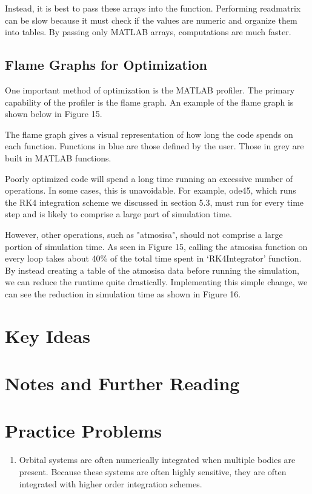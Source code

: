 \documentclass[12pt]{report}
\begin{document}
Instead, it is best to pass these arrays into the function. Performing readmatrix can be slow because it must check if the values are numeric and organize them into tables. By passing only MATLAB arrays, computations are much faster.
\subsection{Flame Graphs for Optimization}
One important method of optimization is the MATLAB profiler. The primary capability of the profiler is the flame graph. An example of the flame graph is shown below in Figure 15.

The flame graph gives a visual representation of how long the code spends on each function. Functions in blue are those defined by the user. Those in grey are built in MATLAB functions.

Poorly optimized code will spend a long time running an excessive number of operations. In some cases, this is unavoidable. For example, ode45, which runs the RK4 integration scheme we discussed in section 5.3, must run for every time step and is likely to comprise a large part of simulation time.

However, other operations, such as "atmosisa", should not comprise a large portion of simulation time. As seen in Figure 15, calling the atmosisa function on every loop takes about 40\% of the total time spent in ‘RK4Integrator’ function. By instead creating a table of the atmosisa data before running the simulation, we can reduce the runtime quite drastically. Implementing this simple change, we can see the reduction in simulation time as shown in Figure 16.


\section{Key Ideas}

\section{Notes and Further Reading}

\section{Practice Problems}

\begin{enumerate}
    \item Orbital systems are often numerically integrated when multiple bodies are present. Because these systems are often highly sensitive, they are often integrated with higher order integration schemes. 
\end{enumerate}
\end{document}
